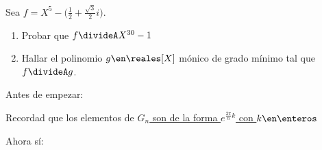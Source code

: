 \begin{enunciado}{\ejExtra}
  Sea $f = X^5 - \big(\frac{1}{2} + \frac{\sqrt{3}}{2}i \big)$.
  \begin{enumerate}[label=\alph*)]
    \item Probar que $ f \divideA X^{30} - 1$
    \item Hallar el polinomio $g \en \reales[X]$ mónico de grado mínimo tal que $f \divideA g$.
  \end{enumerate}
\end{enunciado}

Antes de empezar:
\begin{center}
  Recordad que los elementos de \underline{$G_n$ son de la forma $ e^{\frac{2\pi}{n}k}$ con $k \en \enteros$}
\end{center}

Ahora sí:
